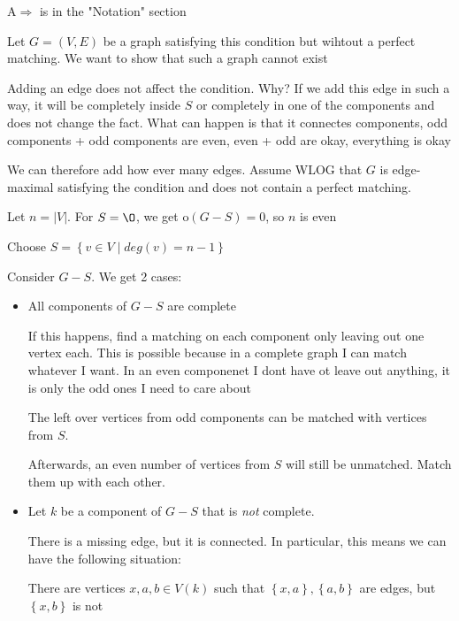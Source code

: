 \newpage
\begin{prf}
  A$\Rightarrow$ is in the "Notation" section
  \par\bigskip
  \noindent Let $G = (V,E)$ be a graph satisfying this condition but wihtout a perfect matching. We want to show that such a graph cannot exist
  \par\bigskip
  \noindent Adding an edge does not affect the condition. Why? If we add this edge in such a way, it will be completely inside $S$ or completely in one of the components and does not change the fact. What can happen is that it connectes components, odd components + odd components are even, even + odd are okay, everything is okay
  \par\bigskip
  \noindent We can therefore add how ever many edges. Assume WLOG that $G$ is edge-maximal satisfying the condition and does not contain a perfect matching.  
  \par\bigskip
  \noindent Let $n = \left|V\right|$. For $S = \O$, we get o$(G-S) = 0$, so $n$ is even
  \par\bigskip
  \noindent Choose $S = \left\{v\in V\;|\; deg(v) = n-1\right\}$\par
  \noindent Consider $G-S$. We get 2 cases:\par
  \begin{itemize}
    \item All components of $G-S$ are complete\par
      If this happens, find a matching on each component only leaving out one vertex each. This is possible because in a complete graph I can match whatever I want. In an even componenet I dont have ot leave out anything, it is only the odd ones I need to care about
      \par
      The left over vertices from odd components can be matched with vertices from $S$.\par
      Afterwards, an even number of vertices from $S$ will still be unmatched. Match them up with each other. 
      \par\bigskip
    \item Let $k$ be a component of $G-S$ that is \textit{not} complete.
      \par\bigskip
      There is a missing edge, but it is connected. In particular, this means we can have the following situation:\par
    There are vertices $x,a,b\in V(k)$ such that $\left\{x,a\right\}, \left\{a,b\right\}$ are edges, but $\left\{x,b\right\}$ is not
    \par\bigskip

\end{itemize}
\end{prf}
